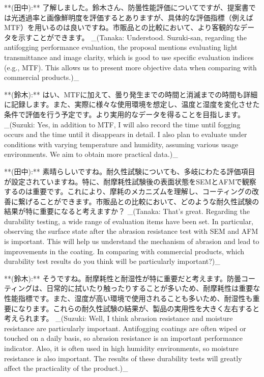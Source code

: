 \documentclass{article}
\begin{document}
**(田中):** 了解しました。鈴木さん、防曇性能評価についてですが、提案書では光透過率と画像鮮明度を評価するとありますが、具体的な評価指標（例えばMTF）を用いるのは良いですね。市販品との比較において、より客観的なデータを示すことができます。
_(Tanaka: Understood. Suzuki-san, regarding the antifogging performance evaluation, the proposal mentions evaluating light transmittance and image clarity, which is good to use specific evaluation indices (e.g., MTF). This allows us to present more objective data when comparing with commercial products.)_

**(鈴木):** はい、MTFに加えて、曇り発生までの時間と消滅までの時間も詳細に記録します。また、実際に様々な使用環境を想定し、温度と湿度を変化させた条件で評価を行う予定です。より実用的なデータを得ることを目指します。
_(Suzuki: Yes, in addition to MTF, I will also record the time until fogging occurs and the time until it disappears in detail. I also plan to evaluate under conditions with varying temperature and humidity, assuming various usage environments. We aim to obtain more practical data.)_

**(田中):** 素晴らしいですね。耐久性試験についても、多岐にわたる評価項目が設定されていますね。特に、耐摩耗性試験後の表面状態をSEMとAFMで観察するのは重要です。これにより、摩耗のメカニズムを理解し、コーティングの改善に繋げることができます。市販品との比較において、どのような耐久性試験の結果が特に重要になると考えますか？
_(Tanaka: That's great. Regarding the durability testing, a wide range of evaluation items have been set. In particular, observing the surface state after the abrasion resistance test with SEM and AFM is important. This will help us understand the mechanism of abrasion and lead to improvements in the coating. In comparing with commercial products, which durability test results do you think will be particularly important?)_

**(鈴木):** そうですね。耐摩耗性と耐湿性が特に重要だと考えます。防曇コーティングは、日常的に拭いたり触ったりすることが多いため、耐摩耗性は重要な性能指標です。また、湿度が高い環境で使用されることも多いため、耐湿性も重要になります。これらの耐久性試験の結果が、製品の実用性を大きく左右すると考えられます。
_(Suzuki: Well, I think abrasion resistance and moisture resistance are particularly important. Antifogging coatings are often wiped or touched on a daily basis, so abrasion resistance is an important performance indicator. Also, it is often used in high humidity environments, so moisture resistance is also important. The results of these durability tests will greatly affect the practicality of the product.)_
\end{document}
